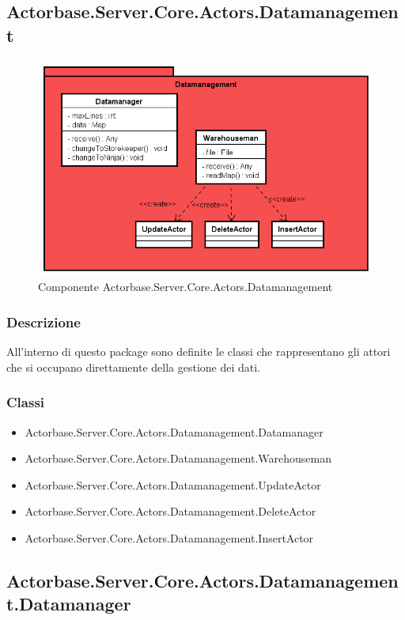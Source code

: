 \documentclass[a4paper]{article}
\begin{document}
			\subsection{Actorbase.Server.Core.Actors.Datamanagement}
			\begin{figure} [H]
			\centering
			\includegraphics[scale=0.55]{Server/Package/DatamanagementLevel.png}
			\caption{Componente Actorbase.Server.Core.Actors.Datamanagement}
			\end{figure}
			\subsubsection{Descrizione}
				All'interno di questo package sono definite le classi che rappresentano gli attori che si occupano direttamente della gestione dei dati.
			\subsubsection{Classi}
			\begin{itemize}
				\item Actorbase.Server.Core.Actors.Datamanagement.Datamanager
				\item Actorbase.Server.Core.Actors.Datamanagement.Warehouseman
				\item Actorbase.Server.Core.Actors.Datamanagement.UpdateActor
				\item Actorbase.Server.Core.Actors.Datamanagement.DeleteActor
				\item Actorbase.Server.Core.Actors.Datamanagement.InsertActor
			\end{itemize}
			
		\subsection{Actorbase.Server.Core.Actors.Datamanagement.Datamanager}
\end{document}
